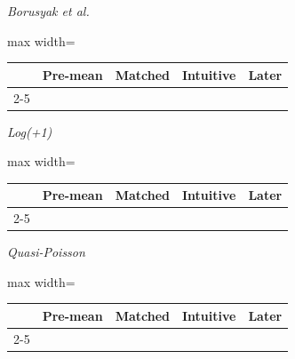 \documentclass[letterpaper,12pt]{article}
\theoremstyle{definition}
\begin{document}
\begin{table}[t]
\begin{threeparttable}
\begin{minipage}[t]{0.49\textwidth}
\emph{Borusyak et al.}\par
\begin{adjustbox}{max width=\linewidth}
\begin{tabular}{@{}lcccc@{}}
\toprule
 & Pre-mean & Matched & Intuitive & Later \\
\cmidrule(lr){2-5}

\bottomrule
\end{tabular}
\end{adjustbox}\vspace{6pt}

\emph{Log(+1)}\par
\begin{adjustbox}{max width=\linewidth}
\begin{tabular}{@{}lcccc@{}}
\toprule
 & Pre-mean & Matched & Intuitive & Later \\
\cmidrule(lr){2-5}

\bottomrule
\end{tabular}
\end{adjustbox}\vspace{6pt}

\emph{Quasi-Poisson}\par
\begin{adjustbox}{max width=\linewidth}
\begin{tabular}{@{}lcccc@{}}
\toprule
 & Pre-mean & Matched & Intuitive & Later \\
\cmidrule(lr){2-5}

\bottomrule
\end{tabular}
\end{adjustbox}
\end{minipage}
\begin{tabular*}{\textwidth}{@{}l@{}}
\end{tabular*}


\end{threeparttable}
\end{table}
\end{document}
